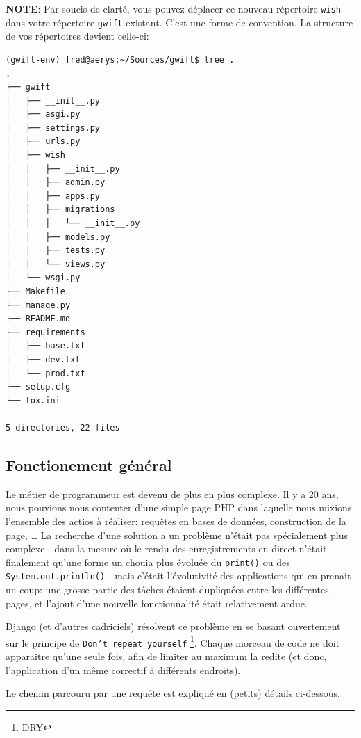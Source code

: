 \documentclass[11pt]{amsbook}
\newcommand{\admonition}[2]{\textbf{#1}: {#2}}
\begin{document}
\admonition{NOTE}{Par soucis de clarté, vous pouvez déplacer ce nouveau répertoire \texttt{wish} dans votre répertoire \texttt{gwift} existant.
C’est une forme de convention.}
La structure de vos répertoires devient celle-ci:


\begin{verbatim}
(gwift-env) fred@aerys:~/Sources/gwift$ tree .
.
├── gwift
│   ├── __init__.py
│   ├── asgi.py
│   ├── settings.py
│   ├── urls.py
│   ├── wish 
│   │   ├── __init__.py
│   │   ├── admin.py
│   │   ├── apps.py
│   │   ├── migrations
│   │   │   └── __init__.py
│   │   ├── models.py
│   │   ├── tests.py
│   │   └── views.py
│   └── wsgi.py
├── Makefile
├── manage.py
├── README.md
├── requirements
│   ├── base.txt
│   ├── dev.txt
│   └── prod.txt
├── setup.cfg
└── tox.ini

5 directories, 22 files
\end{verbatim}


\hypertarget{x-fonctionement-général}{\subsection{Fonctionement général}}
Le métier de programmeur est devenu de plus en plus complexe. Il y a 20 ans, nous pouvions nous contenter d’une simple page PHP dans laquelle nous mixions l’ensemble des actios à réaliser: requêtes en bases de données, construction de la page, …​
La recherche d’une solution a un problème n’était pas spécialement plus complexe - dans la mesure où le rendu des enregistrements en direct n’était finalement qu’une forme un chouia plus évoluée du \texttt{print()} ou des \texttt{System.out.println()} - mais c’était l’évolutivité des applications qui en prenait un coup: une grosse partie des tâches étaient dupliquées entre les différentes pages, et l’ajout d’une nouvelle fonctionnalité était relativement ardue.


Django (et d’autres cadriciels) résolvent ce problème en se basant ouvertement sur le principe de \texttt{Don’t repeat yourself} \footnote{DRY}.
Chaque morceau de code ne doit apparaitre qu’une seule fois, afin de limiter au maximum la redite (et donc, l’application d’un même correctif à différents endroits).


Le chemin parcouru par une requête est expliqué en (petits) détails ci-dessous.
\end{document}
